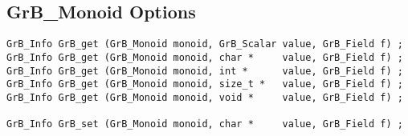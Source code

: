 \newpage
\subsection{{\sf GrB\_Monoid} Options}
\label{get_set_monoid}

\begin{mdframed}[userdefinedwidth=6in]
{\footnotesize
\begin{verbatim}
GrB_Info GrB_get (GrB_Monoid monoid, GrB_Scalar value, GrB_Field f) ;
GrB_Info GrB_get (GrB_Monoid monoid, char *     value, GrB_Field f) ;
GrB_Info GrB_get (GrB_Monoid monoid, int *      value, GrB_Field f) ;
GrB_Info GrB_get (GrB_Monoid monoid, size_t *   value, GrB_Field f) ;
GrB_Info GrB_get (GrB_Monoid monoid, void *     value, GrB_Field f) ;

GrB_Info GrB_set (GrB_Monoid monoid, char *     value, GrB_Field f) ;
\end{verbatim}
}\end{mdframed}


